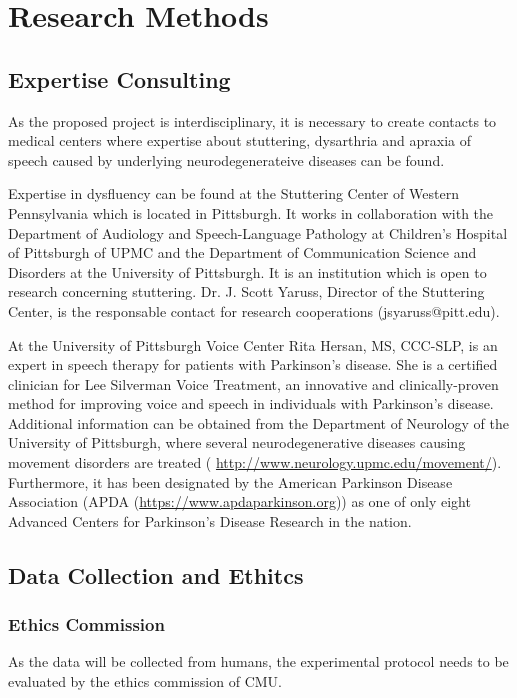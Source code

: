 \chapter{Research Methods}
\label{cha:methods}

\section{Expertise Consulting}

As the proposed project is interdisciplinary, it is necessary to create contacts to medical centers where expertise about stuttering, dysarthria and apraxia of speech caused by underlying neurodegenerateive diseases can be found.

Expertise in dysfluency can be found at the Stuttering Center of Western Pennsylvania which is located in Pittsburgh. It works in collaboration with the Department of Audiology and Speech-Language Pathology at Children's Hospital of Pittsburgh of UPMC and the Department of Communication Science and Disorders at the University of Pittsburgh. It is an institution which is open to research concerning stuttering. Dr. J. Scott Yaruss, Director of the Stuttering Center, is the responsable contact for research cooperations (jsyaruss@pitt.edu).

At the University of Pittsburgh Voice Center Rita Hersan, MS, CCC-SLP, is an expert in speech therapy for patients with Parkinson's disease. She is a certified clinician for Lee Silverman Voice Treatment, an innovative and clinically-proven method for improving voice and speech in individuals with Parkinson's disease. Additional information can be obtained from the Department of Neurology of the University of Pittsburgh, where several neurodegenerative diseases causing movement disorders are treated (
\url{http://www.neurology.upmc.edu/movement/}). Furthermore, it has been designated by the American Parkinson Disease Association (APDA (\url{https://www.apdaparkinson.org})) as one of only eight Advanced Centers for Parkinson’s Disease Research in the nation.

\section{Data Collection and Ethitcs}
\subsection{Ethics Commission}

As the data will be collected from humans, the experimental protocol needs to be evaluated by the ethics commission of CMU.

